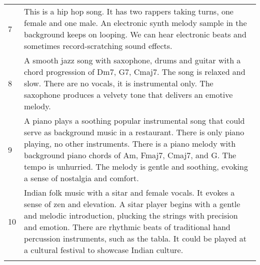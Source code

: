 \documentclass[11pt]{article}
\begin{document}
\begin{table*}[h]
\begin{tabular}{p{0.4cm} p{15cm}}
7& This is a hip hop song. It has two rappers taking turns, one female and one male. An electronic synth melody sample in the background keeps on looping. We can hear electronic beats and sometimes record-scratching sound effects.     \\
8& A smooth jazz song with saxophone, drums and guitar with a chord progression of Dm7, G7, Cmaj7. The song is relaxed and slow. There are no vocals, it is instrumental only. The saxophone produces a velvety tone that delivers an emotive melody. \\
9& A piano plays a soothing popular instrumental song that could serve as background music in a restaurant. There is only piano playing, no other instruments. There is a piano melody with background piano chords of Am, Fmaj7, Cmaj7, and G. The tempo is unhurried. The melody is gentle and soothing, evoking a sense of nostalgia and comfort.    \\
10& Indian folk music with a sitar and female vocals. It evokes a sense of zen and elevation. A sitar player begins with a gentle and melodic introduction, plucking the strings with precision and emotion. There are rhythmic beats of traditional hand percussion instruments, such as the tabla. It could be played at a cultural festival to showcase Indian culture.    \\
  \\ \bottomrule
\end{tabular}
\end{table*}
\end{document}
